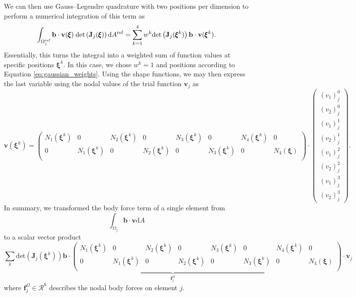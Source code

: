 We can then use Gauss–Legendre quadrature with two positions per dimension to perform a numerical integration of this term as
\begin{equation}
    \int_{\Omega_j^\textrm{ref}} \mathbf{b} \cdot \mathbf{v}(\pmb{\xi}) \hspace{0.25em}\text{det}\left(\mathbf{J}_j(\pmb{\xi})\right)\text{d}A^\textrm{ref}
    = \sum_{k=1}^4 w^k \text{det}\left(\mathbf{J}_j(\pmb{\xi}^k)\right) \mathbf{b} \cdot \mathbf{v}(\pmb{\xi}^k).
\end{equation}
Essentially, this turns the integral into a weighted sum of function values at specific positions $\pmb{\xi}^k$. In this case, we chose $w^k=1$ and positions according to Equation \eqref{eq:gaussian_weights}.
Using the shape functions, we may then express the last variable using the nodal values of the trial function $\mathbf{v}_j$ as  
\setlength\arraycolsep{-2pt}
\begin{equation}
    \mathbf{v}(\pmb{\xi}^k) 
    =
    \begin{pmatrix}
            N_1(\pmb{\xi}^k) & 0 & N_2(\pmb{\xi}^k) & 0 & N_3(\pmb{\xi}^k) & 0 & N_4(\pmb{\xi}^k) & 0\\
            0 & N_1(\pmb{\xi}^k) & 0 & N_2(\pmb{\xi}^k) & 0 & N_3(\pmb{\xi}^k) & 0 & N_4(\pmb{\xi})\\
    \end{pmatrix}
    \cdot 
    \begin{pmatrix}
            {(v_1)}_j^0 \\
            {(v_2)}_j^0 \\
            {(v_1)}_j^1 \\
            {(v_2)}_j^1 \\
            {(v_1)}_j^2 \\
            {(v_2)}_j^2 \\
            {(v_1)}_j^3 \\
            {(v_2)}_j^3 
    \end{pmatrix}.
    \label{eq:shape_interpolation}
\end{equation}
\setlength\arraycolsep{5pt}
In summary, we transformed the body force term of a single element from 
\begin{equation}
    \int_{\Omega_j} \mathbf{b} \cdot \mathbf{v} \text{d}A  
\end{equation}
to a scalar vector product 
\setlength\arraycolsep{-5pt}
\begin{equation}
    \underbrace{\sum_k \text{det}\left(\mathbf{J}_j(\pmb{\xi}^k)\right) \mathbf{b} \cdot
    \begin{pmatrix}
            N_1(\pmb{\xi}^k) & 0 & N_2(\pmb{\xi}^k) & 0 & N_3(\pmb{\xi}^k) & 0 & N_4(\pmb{\xi}^k) & 0\\
            0 & N_1(\pmb{\xi}^k) & 0 & N_2(\pmb{\xi}^k) & 0 & N_3(\pmb{\xi}^k) & 0 & N_4(\pmb{\xi})\\
    \end{pmatrix}}_{\mathbf{f}^\Omega_j}
    \cdot 
    \mathbf{v}_j
\end{equation}
\setlength\arraycolsep{5pt}
where $\mathbf{f}^\Omega_j \in \mathcal{R}^8$ describes the nodal body forces on element $j$. 

